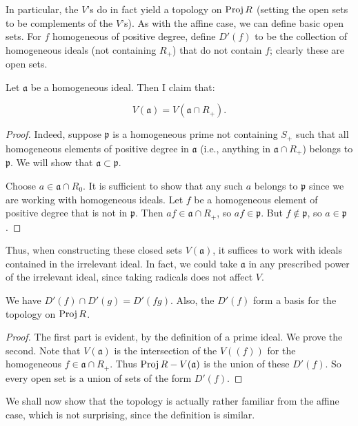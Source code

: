 In particular,  the $V$'s do in fact yield a topology on $\operatorname{Proj} R$ (setting
the open sets to be complements of the $V$'s).
As with the affine case, we can define basic open sets. For $f$
homogeneous of positive degree, define $D'(f)$ to be the
collection of homogeneous ideals (not containing $R_+$) that do not contain $f$; clearly these are
open sets.

Let $\mathfrak{a}$ be a homogeneous ideal. Then I claim that:
\begin{lemma} 
\[  V(\mathfrak{a}) = V(\mathfrak{a} \cap R_+).  \]
\end{lemma} 
\begin{proof} 
Indeed, suppose $\mathfrak{p}$ is a homogeneous prime not containing $S_+$ such that all homogeneous
elements of positive degree in $\mathfrak{a}$ (i.e., anything in $\mathfrak{a}
\cap R_+$) belongs to $\mathfrak{p}$. We will
show that $\mathfrak{a} \subset \mathfrak{p}$.

Choose $a \in \mathfrak{a} \cap R_0$. It is sufficient to show that any such
$a$ belongs to $\mathfrak{p}$ since we are working with homogeneous ideals.
Let $f$ be a homogeneous element of positive degree that is not in
$\mathfrak{p}$.  Then $af \in \mathfrak{a} \cap R_+$, so $af \in \mathfrak{p}$.
But $f \notin \mathfrak{p}$, so $a \in \mathfrak{p}$.
\end{proof} 

Thus, when constructing these closed sets $V(\mathfrak{a})$, it suffices to
work with ideals contained in the irrelevant ideal. In fact, we could take
$\mathfrak{a}$ in any prescribed power of the irrelevant ideal, since taking
radicals does not affect $V$.

\begin{proposition} 
We have $D'(f) \cap D'(g) = D'(fg)$. Also, the $D'(f)$ form a basis for the
topology on $\operatorname{Proj} R$.
\end{proposition} 
\begin{proof} The first part is evident, by the definition of a prime ideal. We prove the second.
Note that $V(\mathfrak{a})$ is the intersection of the $V((f))$ for the
homogeneous $f \in
\mathfrak{a} \cap R_+$. Thus $\operatorname{Proj} R - V(\mathfrak{a})$ is the union of these $D'(f)$. 
So every open set is a union of sets of the form $D'(f)$.
\end{proof} 

We shall now 
show that the topology is actually rather familiar from the affine case, which
is not surprising, since the definition is similar.

